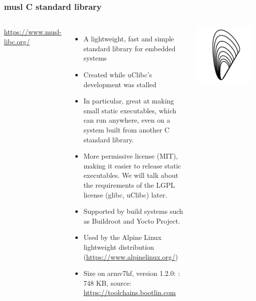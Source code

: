 \begin{frame}
  \frametitle{musl C standard library}
  \begin{columns}
      \url{https://www.musl-libc.org/}
      \begin{itemize}
      \item A lightweight, fast and simple standard library for embedded systems
      \item Created while uClibc's development was stalled
      \item In particular, great at making small static executables,
	    which can run anywhere, even on a system built
            from another C standard library.
      \item More permissive license (MIT), making it easier to release
            static executables. We will talk about the requirements
            of the LGPL license (glibc, uClibc) later.
      \item Supported by build systems such as Buildroot and Yocto
        Project.
      \item Used by the Alpine Linux lightweight distribution
        (\url{https://www.alpinelinux.org/})
      \item Size on armv7hf, version 1.2.0:
        : 748 KB, source: \url{https://toolchains.bootlin.com}
      \end{itemize}
    \includegraphics[width=\textwidth]{slides/sysdev-toolchains-definition/musl.png}
  \end{columns}
\end{frame}

